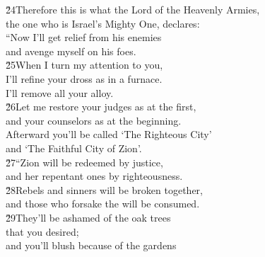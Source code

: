 \begin{poetry}
\poeml \v{24}Therefore this is what the Lord  of the Heavenly Armies, \\
\poemll    the one who is Israel's Mighty One, declares: \\
\poeml ``Now I'll get relief from his enemies \\
\poemll    and avenge myself on his foes. \\
\poeml \v{25}When I turn my attention to you, \\
\poemll    I'll refine your dross as in a furnace. \\
\poemlll       I'll remove all your alloy. \\
\poeml \v{26}Let me restore your judges as at the first, \\
\poemll    and your counselors as at the beginning. \\
\poeml Afterward you'll be called `The Righteous City' \\
\poemll    and `The Faithful City of Zion'. \\
\poeml \v{27}``Zion will be redeemed by justice, \\
\poemll    and her repentant ones by righteousness. \\
\poeml \v{28}Rebels and sinners will be broken together, \\
\poemll    and those who forsake the  will be consumed. \\
\poeml \v{29}They'll be ashamed of the oak trees \\
\poemll    that you desired; \\
\poeml and you'll blush because of the gardens \\

\end{poetry}
